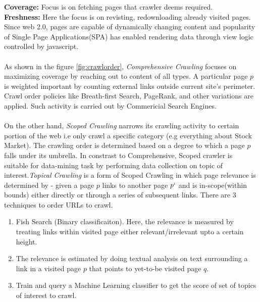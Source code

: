 \noindent
\textbf{Coverage:} Focus is on fetching pages that crawler deems required. 
\\
\textbf{Freshness:} Here the focus is on revisting, redownloading already visited pages. Since web 2.0,
pages are capable of dynamically changing content and popularity of Single Page Applications(SPA) has
enabled rendering data through view logic controlled by javascript.
\\
\\
As shown in the figure \ref{fig:crawlorder}, \textit{Comprehensive Crawling} focuses on maximizing coverage by reaching out to content of all types.
A particular page $p$ is weighted important by counting external links outside current site's perimeter. Crawl order policies like Breath-first Search, PageRank, and other variations are applied. Such activity
is carried out by Commericial Search Engines.
\\
\\
On the other hand, \textit{Scoped Crawling} narrows its
crawling activity to certain portion of the web i.e only crawl a specific category (e.g everything about Stock Market). The crawling order is determined based on a degree to which a page $p$ falls under its umbrella.
In constrast to Comprehensive, Scoped crawler is suitable for data-mining task by performing
data collection on topic of interest.\textit{Topical Crawling} is a form of Scoped Crawling in which page relevance is determined by - given a  page $p$ links to another page $p`$ and is in-scope(within bounds) either directly or through a series of subsequent links. There are 3 techniques to order URLs to crawl.

\begin{enumerate}
\item Fish Search (Binary classificaiton). Here, the relevance is measured by treating links within visited
  page either relevant/irrelevant upto a certain height.
\item The relevance is estimated by doing textual analysis on text surrounding a link in a visited page $p$
  that points to yet-to-be visited page $q$.
\item Train and query a Machine Learning classifier to get the score of set of topics of interest to crawl.
\end{enumerate}

